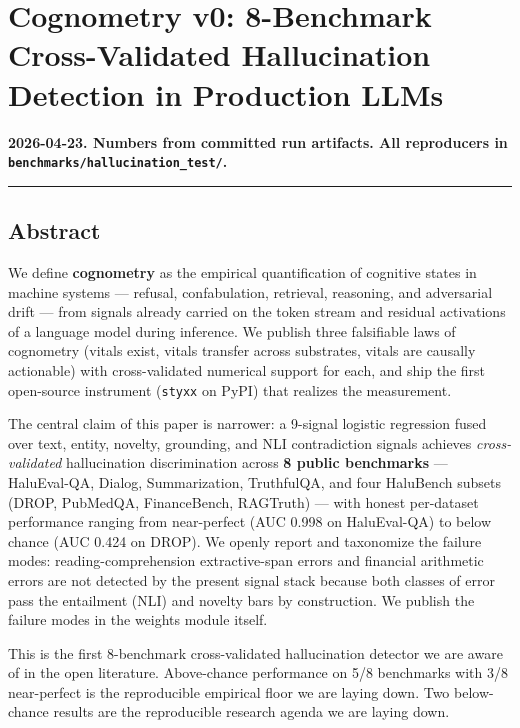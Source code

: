 \documentclass[
  11pt]{article}
\author{}
\date{}
\begin{document}
\section{Cognometry v0: 8-Benchmark Cross-Validated Hallucination
Detection in Production
LLMs}\label{cognometry-v0-8-benchmark-cross-validated-hallucination-detection-in-production-llms}

\textbf{2026-04-23. Numbers from committed run artifacts. All
reproducers in \texttt{benchmarks/hallucination\_test/}.}

\begin{center}\rule{0.5\linewidth}{0.5pt}\end{center}

\subsection{Abstract}\label{abstract}

We define \textbf{cognometry} as the empirical quantification of
cognitive states in machine systems --- refusal, confabulation,
retrieval, reasoning, and adversarial drift --- from signals already
carried on the token stream and residual activations of a language model
during inference. We publish three falsifiable laws of cognometry
(vitals exist, vitals transfer across substrates, vitals are causally
actionable) with cross-validated numerical support for each, and ship
the first open-source instrument (\texttt{styxx} on PyPI) that realizes
the measurement.

The central claim of this paper is narrower: a 9-signal logistic
regression fused over text, entity, novelty, grounding, and NLI
contradiction signals achieves \emph{cross-validated} hallucination
discrimination across \textbf{8 public benchmarks} --- HaluEval-QA,
Dialog, Summarization, TruthfulQA, and four HaluBench subsets (DROP,
PubMedQA, FinanceBench, RAGTruth) --- with honest per-dataset
performance ranging from near-perfect (AUC 0.998 on HaluEval-QA) to
below chance (AUC 0.424 on DROP). We openly report and taxonomize the
failure modes: reading-comprehension extractive-span errors and
financial arithmetic errors are not detected by the present signal stack
because both classes of error pass the entailment (NLI) and novelty bars
by construction. We publish the failure modes in the weights module
itself.

This is the first 8-benchmark cross-validated hallucination detector we
are aware of in the open literature. Above-chance performance on 5/8
benchmarks with 3/8 near-perfect is the reproducible empirical floor we
are laying down. Two below-chance results are the reproducible research
agenda we are laying down.
\end{document}
